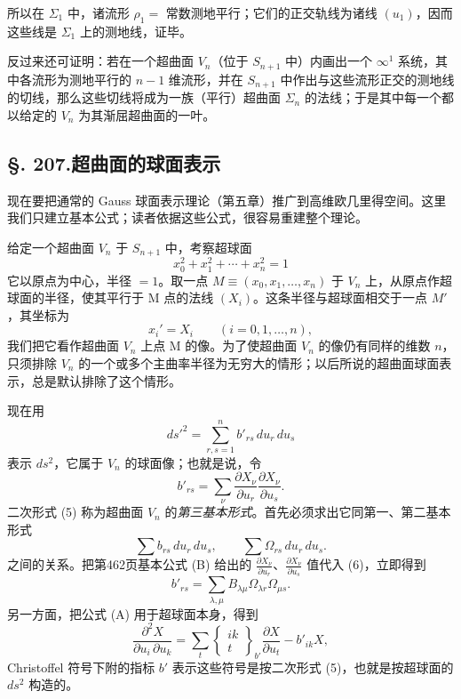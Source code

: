所以在 $\Sigma_1$ 中，诸流形 $\rho_1=$ 常数测地平行；它们的正交轨线为诸线 $(u_1)$，因而这些线是 $\Sigma_1$ 上的测地线，证毕。

反过来还可证明：若在一个超曲面 $V_n$（位于 $S_{n+1}$ 中）内画出一个 $\infty^1$ 系统，其中各流形为测地平行的 $n-1$ 维流形，并在 $S_{n+1}$ 中作出与这些流形正交的测地线的切线，那么这些切线将成为一族（平行）超曲面 $\Sigma_n$ 的法线；于是其中每一个都以给定的 $V_n$ 为其渐屈超曲面的一叶。

\subsection*{\S. 207.\quad 超曲面的球面表示}

现在要把通常的 Gauss 球面表示理论（第五章）推广到高维欧几里得空间。这里我们只建立基本公式；读者依据这些公式，很容易重建整个理论。

给定一个超曲面 $V_n$ 于 $S_{n+1}$ 中，考察超球面
\[
x_0^2+x_1^2+\cdots+x_n^2=1
\]
它以原点为中心，半径 $=1$。取一点 $M\equiv(x_0,x_1,\ldots,x_n)$ 于 $V_n$ 上，从原点作超球面的半径，使其平行于 M 点的法线 $(X_i)$。这条半径与超球面相交于一点 $M'$，其坐标为
\[
x_i'=X_i\qquad (i=0,1,\ldots,n),
\]
我们把它看作超曲面 $V_n$ 上点 M 的像。为了使超曲面 $V_n$ 的像仍有同样的维数 $n$，只须排除 $V_n$ 的一个或多个主曲率半径为无穷大的情形；以后所说的超曲面球面表示，总是默认排除了这个情形。

现在用
\[
\tag{5}
ds'^2=\sum_{r,s=1}^{n}b'_{rs}\,du_r\,du_s
\]
表示 $ds^2$，它属于 $V_n$ 的球面像；也就是说，令
\[
\tag{6}
b'_{rs}=\sum_\nu\frac{\partial X_\nu}{\partial u_r}\frac{\partial X_\nu}{\partial u_s}.
\]
二次形式 (5) 称为超曲面 $V_n$ 的\emph{第三基本形式}。首先必须求出它同第一、第二基本形式
\[
\sum b_{rs}\,du_r\,du_s,\qquad
\sum \Omega_{rs}\,du_r\,du_s.
\]
之间的关系。把第462页基本公式 (B) 给出的 $\frac{\partial X_\nu}{\partial u_r}$、$\frac{\partial X_\nu}{\partial u_s}$ 值代入 (6)，立即得到
\[
\tag{7}
b'_{rs}=\sum_{\lambda,\mu}B_{\lambda\mu}\Omega_{\lambda r}\Omega_{\mu s}.
\]
另一方面，把公式 (A) 用于超球面本身，得到
\[
\tag{A*}
\frac{\partial^2X}{\partial u_i\,\partial u_k}
=\sum_t\left\{\begin{matrix}ik\\ t\end{matrix}\right\}_{b'}
\frac{\partial X}{\partial u_t}-b'_{ik}X,
\]
Christoffel 符号下附的指标 $b'$ 表示这些符号是按二次形式 (5)，也就是按超球面的 $ds^2$ 构造的。

